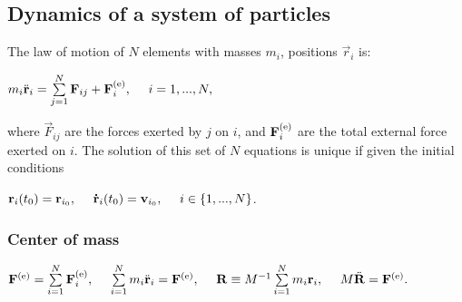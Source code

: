 \subsection{Dynamics of a system of particles}
The law of motion of $N$ elements with masses $m_{i}$, positions $\vec{r}_{i}$ is:\\
\centerline{$m_{i}\ddot{\vec{r}}_{i}=\sum\limits_{j=1}^{N}\vec{F}_{ij}+\vec{F}_{i}\ext,\ \ \ \ i=1,...,N,$}
where $\vec{F}_{ij}$ are the forces exerted by $j$ on $i$, and $\mathbf{F}_{i}^{\text{(e)}}$ are the total external force exerted on $i$.
The solution of this set of $N$ equations is unique if given the initial conditions\\
\centerline{$\vec{r}_{i}(t_{0})=\vec{r}_{i_{0}},\ \ \ \ \dotv{r}_{i}(t_{0})=\vec{v}_{i_{0}},\ \ \ \ i\in\{1,...,N\}$.}
\subsubsection*{Center of mass}
\centerline{$\vec{F}\ext=\sum\limits_{i=1}^{N}\vec{F}\i\ext,\ \ \ \ \sum\limits_{i=1}^{N}m\i\ddot{\vec{r}}\i=\vec{F}\ext,\ \ \ \ \vec{R}\equiv M^{-1}\sum\limits_{i=1}^{N}m\i\vec{r}\i,\ \ \ \ M\ddot{\vec{R}}=\vec{F}\ext.$}



